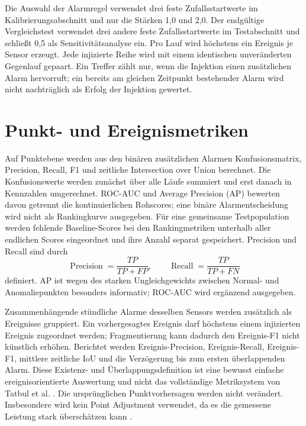 Die Auswahl der Alarmregel verwendet drei feste Zufallsstartwerte im
Kalibrierungsabschnitt und nur die Stärken 1{,}0 und 2{,}0. Der endgültige
Vergleichstest verwendet drei andere feste Zufallsstartwerte im Testabschnitt und schließt
0{,}5 als Sensitivitätsanalyse ein. Pro Lauf wird höchstens ein Ereignis je
Sensor erzeugt. Jede injizierte Reihe wird mit einem identischen unveränderten
Gegenlauf gepaart. Ein Treffer zählt nur, wenn die Injektion einen zusätzlichen
Alarm hervorruft; ein bereits am gleichen Zeitpunkt bestehender Alarm wird
nicht nachträglich als Erfolg der Injektion gewertet.

\section{Punkt- und Ereignismetriken}

Auf Punktebene werden aus den binären zusätzlichen Alarmen Konfusionsmatrix,
Precision, Recall, F1 und zeitliche Intersection over Union berechnet. Die
Konfusionswerte werden zunächst über alle Läufe summiert und erst danach in
Kennzahlen umgerechnet. ROC-AUC und Average Precision (AP) bewerten davon
getrennt die kontinuierlichen Rohscores; eine binäre Alarmentscheidung wird
nicht als Rankingkurve ausgegeben. Für eine gemeinsame Testpopulation werden
fehlende Baseline-Scores bei den Rankingmetriken unterhalb aller endlichen
Scores eingeordnet und ihre Anzahl separat gespeichert. Precision und Recall
sind durch
\begin{equation}
 \operatorname{Precision}=\frac{TP}{TP+FP}, \qquad
 \operatorname{Recall}=\frac{TP}{TP+FN}
\end{equation}
definiert. AP ist wegen des starken Ungleichgewichts zwischen
Normal- und Anomaliepunkten besonders informativ; ROC-AUC wird ergänzend
ausgegeben.

Zusammenhängende stündliche Alarme desselben Sensors werden zusätzlich als
Ereignisse gruppiert. Ein vorhergesagtes Ereignis darf höchstens einem
injizierten Ereignis zugeordnet werden; Fragmentierung kann dadurch den
Ereignis-F1 nicht künstlich erhöhen. Berichtet werden Ereignis-Precision,
Ereignis-Recall, Ereignis-F1, mittlere zeitliche IoU und die Verzögerung bis
zum ersten überlappenden Alarm. Diese Existenz- und Überlappungsdefinition ist
eine bewusst einfache ereignisorientierte Auswertung und nicht das vollständige
Metriksystem von Tatbul et al. \cite{tatbul2018precision}. Die ursprünglichen
Punktvorhersagen werden nicht verändert. Insbesondere wird kein Point
Adjustment verwendet, da es die gemessene Leistung stark überschätzen kann
\cite{kim2022rigorous}.

